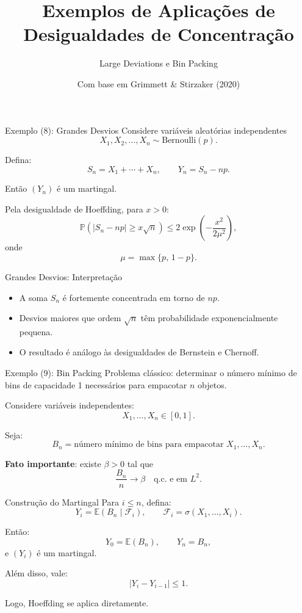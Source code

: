 \documentclass{beamer}
\title{Exemplos de Aplicações de Desigualdades de Concentração}
\subtitle{Large Deviations e Bin Packing}
\author{Com base em Grimmett \& Stirzaker (2020)}
\date{}
\begin{document}
\begin{frame}
  \titlepage
\end{frame}

\begin{frame}{Exemplo (8): Grandes Desvios}
Considere variáveis aleatórias independentes
\[
X_1, X_2,\ldots, X_n \sim \mathrm{Bernoulli}(p).
\]

Defina:
\[
S_n = X_1 + \cdots + X_n, 
\qquad 
Y_n = S_n - np.
\]

Então $(Y_n)$ é um martingal.

\medskip

Pela desigualdade de Hoeffding, para $x>0$:
\[
\mathbb{P}\!\left(|S_n - np| \ge x\sqrt{n}\right)
\le 
2 \exp\!\left( -\frac{x^2}{2\mu^2} \right),
\]
onde 
\[
\mu = \max\{p,\,1-p\}.
\]
\end{frame}

\begin{frame}{Grandes Desvios: Interpretação}
\begin{itemize}
    \item A soma $S_n$ é fortemente concentrada em torno de $np$.
    \item Desvios maiores que ordem $\sqrt{n}$ têm probabilidade exponencialmente pequena.
    \item O resultado é análogo às desigualdades de Bernstein e Chernoff.
\end{itemize}
\end{frame}

\begin{frame}{Exemplo (9): Bin Packing}
Problema clássico: determinar o número mínimo de bins de capacidade 1 necessários para empacotar $n$ objetos.

\medskip

Considere variáveis independentes:
\[
X_1, \ldots, X_n \in [0,1].
\]

Seja:
\[
B_n = \text{número mínimo de bins para empacotar } X_1,\ldots,X_n.
\]

\medskip

\textbf{Fato importante}: existe $\beta > 0$ tal que
\[
\frac{B_n}{n} \longrightarrow \beta
\quad \text{q.c. e em } L^2.
\]
\end{frame}

\begin{frame}{Construção do Martingal}
Para $i \le n$, defina:
\[
Y_i = \mathbb{E}(B_n \mid \mathcal{F}_i),
\qquad
\mathcal{F}_i = \sigma(X_1,\ldots,X_i).
\]

Então:
\[
Y_0 = \mathbb{E}(B_n),
\qquad
Y_n = B_n,
\]
e $(Y_i)$ é um martingal.

\medskip

Além disso, vale:
\[
|Y_i - Y_{i-1}| \le 1.
\]

Logo, Hoeffding se aplica diretamente.
\end{frame}
\end{document}
